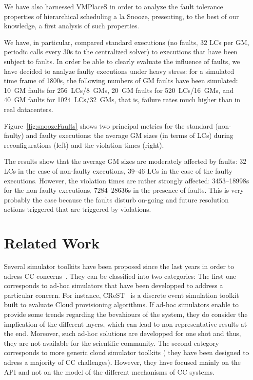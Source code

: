 We have also harnessed VMPlaceS in order to analyze the fault
tolerance properties of hierarchical scheduling a la Snooze,
presenting, to the best of our knowledge, a first analysis of such
properties.

We have, in particular, compared standard executions (no faults, 32
LCs per GM, periodic calls every 30s to the centralized solver) to
executions that have been subject to faults. In order be able to
clearly evaluate the influence of faults, we have decided to analyze
faulty executions under heavy stress: for a simulated time frame of
1800s, the following numbers of GM faults have been simulated: 10~GM
faults for 256~LCs/8~GMs, 20~GM faults for 520~LCs/16~GMs, and 40~GM
faults for 1024~LCs/32~GMs, that is, failure rates much higher than in
real datacenters.

Figure~\ref{fig:snoozeFaults} shows two principal metrics for the
standard (non-faulty) and faulty executions: the average GM sizes (in
terms of LCs) during reconfigurations (left) and the violation times
(right).

The results show that the average GM sizes are moderately affected by
faults: 32 LCs in the case of non-faulty executions, 39--46 LCs in the
case of the faulty executions. However, the violation times are rather
strongly affected: 3453--18998s for the non-faulty executions,
7284--28636s in the presence of faults. This is very probably the case
because the faults disturb on-going and future resolution actions
triggered that are triggered by violations.



\section{Related Work}
\label{sec:related}

Several simulator toolkits have been proposed since the last years in
order to adress CC concerns~\cite{CC13, DGSIM, cloudsim, icancloud,
  greencloud}.  They can be classified into two categories: The first
one corresponds to ad-hoc simulators that have been developped to
address a particular concern. For instance, CReST~\cite{CC13} is a
discrete event simulation toolkit built to evaluate Cloud provisioning
algorithms. If ad-hoc simulators enable to provide some trends
regarding the bevahiours of the system, they do consider the
implication of the different layers, which can lead to non
representative results at the end. Moreover, such ad-hoc solutions are
developped for one shot and thus, they are not available for the
scientific community. The second category \cite{icancloud, greencloud,
  cloudsim} corresponds to more generic cloud simulator toolkits (\ie
they have been designed to adress a majority of CC
challenges). However, they have focused mainly on the API and not on
the model of the different mechanisms of CC systems.

